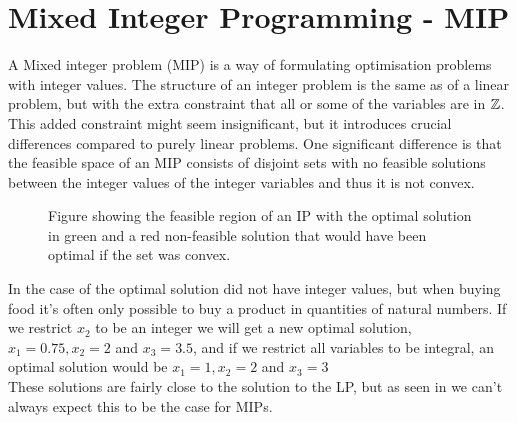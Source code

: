 \section{Mixed Integer Programming - MIP}
A Mixed integer problem (MIP) is a way of formulating optimisation problems with integer values. The structure of an integer problem is the same as of a linear problem, but with the extra constraint that all or some of the variables are in $\mathbb{Z}$. This added constraint might seem insignificant, but it introduces crucial differences compared to purely linear problems. One significant difference is that the feasible space of an MIP consists of disjoint sets with no feasible solutions between the integer values of the integer variables and thus it is not convex.
\begin{figure}[H]\label{IP figure}
\centering
{}
\caption{Figure showing the feasible region of an IP with the optimal solution in green and a red non-feasible solution that would have been optimal if the set was convex.}
\end{figure}
In the case of  the optimal solution did not have integer values, but when buying food it's often only possible to buy a product in quantities of natural numbers. If we restrict $x_2$ to be an integer we will get a new optimal solution, $x_1=0.75, x_2=2$ and $x_3= 3.5$, and if we restrict all variables to be integral, an optimal solution would be $x_1=1, x_2=2$ and $x_3= 3$\\
These solutions are fairly close to the solution to the LP, but as seen in  we can't always expect this to be the case for MIPs.
